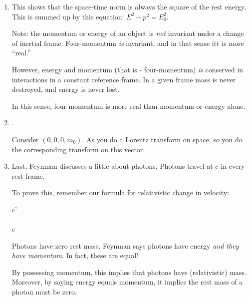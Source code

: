\begin{enumerate}
  \item This shows that the space-time norm is always the square of the
  rest energy. This is summed up by this equation: $E^2 - p^2 = E_0^2$.

  Note: the momentum or energy of an object is \emph{not} invariant
  under a change of inertial frame. Four-momentum \emph{is} invariant,
  and in that sense itt is more ``real.''

  However, energy and momentum (that is - four-momentum) \emph{is}
  conserved in interactions in a constant reference frame. In a given
  frame mass is never destroyed, and energy is never lost.

  In this sense, four-momentum is more real than momentum or energy
  alone.

  \item {}.

  Consider $(0, 0, 0, m_0)$. As you do a Lorentz transform on space, so
  you do the corresponding transform on this vector.

  \item Last, Feynman discusses a little about photons. Photons travel
  at $c$ in every rest frame.

  To prove this, remember our formula for relativistic change in
  velocity:

  \begin{nedqn}
    c'
  \eqcol
  \\
  \eqcol
  \\
  \eqcol
    c
  \end{nedqn}

  Photons have zero rest mass. Feynman says photons have energy
  \emph{and they have momentum}. In fact, these are equal!

  By possessing momentum, this implies that photons have (relativistic)
  mass. Moreover, by saying energy equals momentum, it implies the rest
  mass of a photon must be zero.

\end{enumerate}
